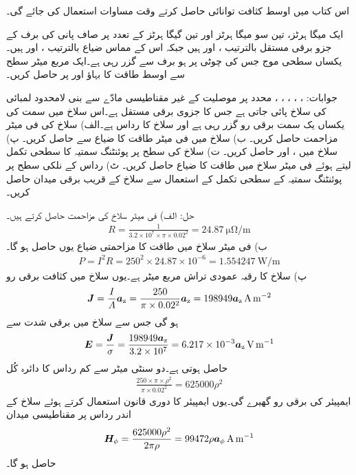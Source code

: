 اس کتاب میں اوسط کثافت توانائی حاصل کرتے  وقت مساوات  استعمال کی جائے گی۔

ایک میگا ہرٹز، تین سو میگا ہرٹز اور تین گیگا ہرٹز کے تعدد پر صاف پانی کی برف کے جزو برقی مستقل بالترتیب  ،  اور  ہیں جبکہ اس کے مماس ضیاع بالترتیب  ،   اور  ہیں۔ یکساں سطحی موج جس کی چوٹی  پر  ہو برف سے گزر رہی ہے۔ایک مربع میٹر سطح سے اوسط طاقت کا بہاؤ  اور  پر حاصل کریں۔

جوابات: ، ، ، ،  ،   
 محدد پر  موصلیت کے غیر مقناطیسی مادّے سے بنی لامحدود لمبائی کی سلاخ پائی جاتی ہے جس کا جزوی برقی مستقل   ہے۔اس سلاخ میں  سمت  کی یکساں یک سمت برقی رو گزر رہی ہے اور سلاخ کا رداس  ہے۔الف) سلاخ کی فی میٹر مزاحمت حاصل کریں۔ ب) سلاخ میں فی میٹر طاقت کا ضیاع  سے حاصل کریں۔ پ) سلاخ میں ،  اور  حاصل کریں۔ ت) سلاخ کی سطح پر پوئنٹنگ سمتیہ کا سطحی تکمل لیتے ہوئے فی میٹر سلاخ میں طاقت کا ضیاع حاصل کریں۔ ٹ) رداس  کے نلکی سطح پر پوئنٹنگ سمتیہ کے سطحی تکمل کے استعمال سے سلاخ کے قریب برقی میدان حاصل کریں۔

حل: الف) فی میٹر سلاخ کی مزاحمت حاصل کرتے ہیں۔ 
\begin{align*}
R=\frac{1}{3.2\times 10^7 \times \pi \times 0.02^2}=\SI{24.87}{\micro\ohm\per\meter}
\end{align*} 
ب) فی میٹر سلاخ میں طاقت کا مزاحمتی ضیاع یوں حاصل ہو گا۔
\begin{align*}
P=I^2 R=250^2 \times 24.87 \times 10^{-6}=\SI{1.554247}{\watt\per\meter}
\end{align*}
پ) سلاخ کا رقبہ عمودی تراش  مربع میٹر ہے۔یوں سلاخ میں کثافت برقی رو
\begin{align*}
{\ensuremath{{\boldsymbol{J}}}}=\frac{I}{A} {\boldsymbol{a}}_{\textup{z}} =\frac{250}{\pi \times 0.02^2} {\boldsymbol{a}}_{\textup{z}}=198949 {\boldsymbol{a}}_{\textup{z}} \, \si{\ampere\per\meter\squared}
\end{align*}
ہو گی جس سے سلاخ میں برقی شدت  سے 
\begin{align*}
{\ensuremath{{\boldsymbol{E}}}}=\frac{{{\boldsymbol{J}}}}{\sigma}=\frac{198949 {\boldsymbol{a}}_{\textup{z}}}{3.2\times 10^7}=6.217\times 10^{-3} {\boldsymbol{a}}_{\textup{z}} \, \si{\volt\per\meter}
\end{align*}
حاصل ہوتی ہے۔دو سنٹی میٹر سے کم رداس  کا دائرہ کُل
\begin{align*}
\frac{250 \times \pi \times \rho^2}{\pi \times 0.02^2}=625000 \rho^2
\end{align*}
ایمپیئر کی برقی رو گھیرے گی۔یوں ایمپیئر کا دوری قانون استعمال کرتے ہوئے سلاخ کے اندر رداس  پر مقناطیسی میدان
\begin{align*}
{\ensuremath{{\boldsymbol{H}}}}_{\phi}=\frac{625000 \rho^2}{2\pi \rho}=99472 \rho  {\boldsymbol{a}}_{\phi} \, \si{\ampere\per\meter}
\end{align*}
حاصل ہو گا۔

